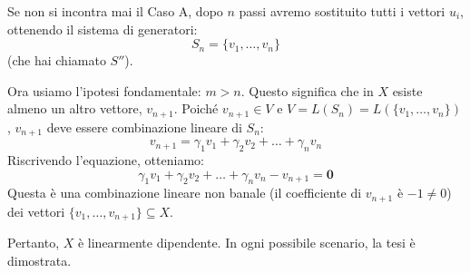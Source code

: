 {    Se non si incontra mai il Caso A, dopo \(n\) passi avremo sostituito tutti i vettori \(u_i\), ottenendo il sistema di generatori:
    \[ S_n = \{v_1, \dots, v_n\} \]
    (che hai chiamato \(S''\)).

    Ora usiamo l'ipotesi fondamentale: \( m > n \).
    Questo significa che in \(X\) esiste almeno un altro vettore, \(v_{n+1}\).
    Poiché \(v_{n+1} \in V\) e \(V = L(S_n) = L(\{v_1, \dots, v_n\})\), \(v_{n+1}\) deve essere combinazione lineare di \(S_n\):
    \[ v_{n+1} = \gamma_1 v_1 + \gamma_2 v_2 + \dots + \gamma_n v_n \]
    Riscrivendo l'equazione, otteniamo:
    \[ \gamma_1 v_1 + \gamma_2 v_2 + \dots + \gamma_n v_n - v_{n+1} = \mathbf{0} \]
    Questa è una combinazione lineare non banale (il coefficiente di \(v_{n+1}\) è \(-1 \neq 0\)) dei vettori \(\{v_1, \dots, v_{n+1}\} \subseteq X\).

    Pertanto, \(X\) è linearmente dipendente. In ogni possibile scenario, la tesi è dimostrata.
}

